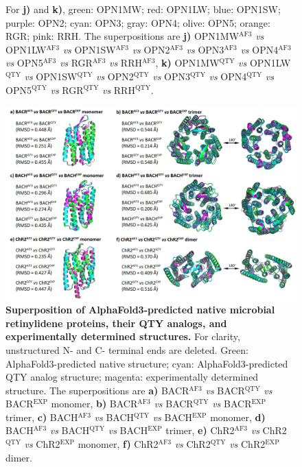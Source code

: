\documentclass[fleqn, 10pt, lineno]{manuscript}
\begin{document}
\begin{figure}[htbp]
{    For \textbf{j)} and \textbf{k)}, green: OPN1MW; red: OPN1LW; blue: OPN1SW; purple: OPN2; cyan: OPN3; gray: OPN4; olive: OPN5; orange: RGR; pink: RRH. The superpositions are
    \textbf{j)} OPN1MW$^{\textrm{AF3}}$ \textit{vs} OPN1LW$^{\textrm{AF3}}$ \textit{vs} OPN1SW$^{\textrm{AF3}}$ \textit{vs} OPN2$^{\textrm{AF3}}$ \textit{vs} OPN3$^{\textrm{AF3}}$ \textit{vs} OPN4$^{\textrm{AF3}}$ \textit{vs} OPN5$^{\textrm{AF3}}$ \textit{vs} RGR$^{\textrm{AF3}}$ \textit{vs} RRH$^{\textrm{AF3}}$, 
    \textbf{k)} OPN1MW$^{\textrm{QTY}}$ \textit{vs} OPN1LW$^{\textrm{QTY}}$ \textit{vs} OPN1SW$^{\textrm{QTY}}$ \textit{vs} OPN2$^{\textrm{QTY}}$ \textit{vs} OPN3$^{\textrm{QTY}}$ \textit{vs} OPN4$^{\textrm{QTY}}$ \textit{vs} OPN5$^{\textrm{QTY}}$ \textit{vs} RGR$^{\textrm{QTY}}$ \textit{vs} RRH$^{\textrm{QTY}}$. 
    }
	\label{fig:humansup}
\end{figure}

\begin{figure}[htbp]
	\centering
	\includegraphics[width=\linewidth]{Figures/superposition-microbial.jpg}
	\caption{\textbf{Superposition of AlphaFold3-predicted native microbial retinylidene proteins, their QTY analogs, and experimentally determined structures. } For clarity, unstructured N- and C- terminal ends are deleted. 
    Green: AlphaFold3-predicted native structure; cyan: AlphaFold3-predicted QTY analog structure; magenta: experimentally determined structure. The superpositions are 
    \textbf{a)} BACR$^{\textrm{AF3}}$ \textit{vs} BACR$^{\textrm{QTY}}$ \textit{vs} BACR$^{\textrm{EXP}}$ monomer, 
    \textbf{b)} BACR$^{\textrm{AF3}}$ \textit{vs} BACR$^{\textrm{QTY}}$ \textit{vs} BACR$^{\textrm{EXP}}$ trimer, 
    \textbf{c)} BACH$^{\textrm{AF3}}$ \textit{vs} BACH$^{\textrm{QTY}}$ \textit{vs} BACH$^{\textrm{EXP}}$ monomer, 
    \textbf{d)} BACH$^{\textrm{AF3}}$ \textit{vs} BACH$^{\textrm{QTY}}$ \textit{vs} BACH$^{\textrm{EXP}}$ trimer, 
    \textbf{e)} ChR2$^{\textrm{AF3}}$ \textit{vs} ChR2$^{\textrm{QTY}}$ \textit{vs} ChR2$^{\textrm{EXP}}$ monomer, 
    \textbf{f)} ChR2$^{\textrm{AF3}}$ \textit{vs} ChR2$^{\textrm{QTY}}$ \textit{vs} ChR2$^{\textrm{EXP}}$ dimer. }
	\label{fig:microbialsup}
\end{figure}
\end{document}

